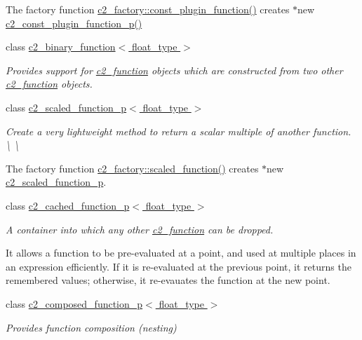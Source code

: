 \begin{DoxyCompactItemize}
\begin{DoxyCompactList}
The factory function \hyperlink{classc2__factory_aebeb20651a347e1fa8f14118faf2588e}{c2\-\_\-factory\-::const\-\_\-plugin\-\_\-function()} creates $\ast$new \hyperlink{classc2__const__plugin__function__p_a443dc7bcbdc6e458673b98aedf53ad56}{c2\-\_\-const\-\_\-plugin\-\_\-function\-\_\-p()} \end{DoxyCompactList}\item 
class \hyperlink{classc2__binary__function}{c2\-\_\-binary\-\_\-function$<$ float\-\_\-type $>$}
\begin{DoxyCompactList}\small\item\em Provides support for \hyperlink{classc2__function}{c2\-\_\-function} objects which are constructed from two other \hyperlink{classc2__function}{c2\-\_\-function} objects. \end{DoxyCompactList}\item 
class \hyperlink{classc2__scaled__function__p}{c2\-\_\-scaled\-\_\-function\-\_\-p$<$ float\-\_\-type $>$}
\begin{DoxyCompactList}\small\item\em Create a very lightweight method to return a scalar multiple of another function. \textbackslash{} \textbackslash{}

The factory function \hyperlink{classc2__factory_a81a7b686b7ffa389ad4dcd8d18997332}{c2\-\_\-factory\-::scaled\-\_\-function()} creates $\ast$new \hyperlink{classc2__scaled__function__p}{c2\-\_\-scaled\-\_\-function\-\_\-p}. \end{DoxyCompactList}\item 
class \hyperlink{classc2__cached__function__p}{c2\-\_\-cached\-\_\-function\-\_\-p$<$ float\-\_\-type $>$}
\begin{DoxyCompactList}\small\item\em A container into which any other \hyperlink{classc2__function}{c2\-\_\-function} can be dropped.

It allows a function to be pre-\/evaluated at a point, and used at multiple places in an expression efficiently. If it is re-\/evaluated at the previous point, it returns the remembered values; otherwise, it re-\/evauates the function at the new point. \end{DoxyCompactList}\item 
class \hyperlink{classc2__composed__function__p}{c2\-\_\-composed\-\_\-function\-\_\-p$<$ float\-\_\-type $>$}
\begin{DoxyCompactList}\small\item\em Provides function composition (nesting)


\end{DoxyCompactList}
\end{DoxyCompactItemize}
